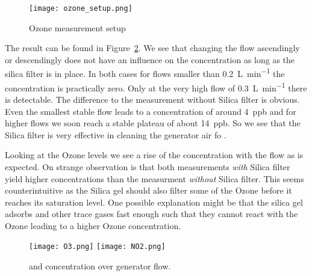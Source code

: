 \begin{figure}[htbp]
  \centering
  \texttt{[image: ozone\_setup.png]}
  \caption{Ozone measurement setup}
  \label{fig:ozone-flow-setup}
\end{figure}

The result can be found in Figure~\ref{fig:o3-flow}. We see that
changing the flow ascendingly or descendingly does not have an
influence on the  concentration as long as the silica filter
is in place. In both cases for flows smaller than
\SI{0.2}{\liter\per\minute} the concentration is practically
zero. Only at the very high flow of \SI{0.3}{\liter\per\minute} there
is  detectable. The difference to the measurement without
Silica filter is obvious. Even the smallest stable flow leads to a
concentration of around \SI{4}{ppb} and for higher flows we soon reach
a stable plateau of about \SI{14}{ppb}. So we see that the Silica
filter is very effective in cleaning the generator air fo .

Looking at the Ozone levels we see a rise of the concentration with
the flow as is expected. On strange observation is that both
measurements \emph{with} Silica filter yield higher concentrations
than the measurment \emph{without} Silica filter. This seems
counterintuitive as the Silica gel should also filter some of the
Ozone before it reaches its saturation level. One possible explanation
might be that the silica gel adsorbs  and other trace gases
fast enough such that they cannot react with the Ozone leading to a
higher Ozone concentration. 

\begin{figure}[htbp]
  \centering
  \texttt{[image: O3.png]}
  \hfill
  \texttt{[image: NO2.png]}
  \caption{ and  concentration over generator flow.}
  \label{fig:o3-flow}
\end{figure}


